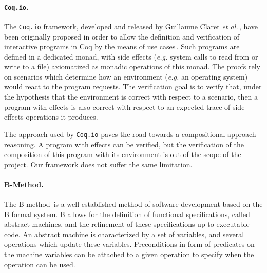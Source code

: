\paragraph{\texttt{Coq.io}.}
%
The \texttt{Coq.io} framework, developed and released by Guillaume Claret
\emph{et al.}\,\cite{claret2015coqiowww}, have been originally proposed in order
to allow the definition and verification of interactive programs in Coq by the
means of use cases\,\cite{claret2015coqio}.
%
Such programs are defined in a dedicated monad, with side effects (\emph{e.g.}
system calls to read from or write to a file) axiomatized as monadic operations
of this monad.
%
The proofs rely on scenarios which determine how an environment (\emph{e.g.} an
operating system) would react to the program requests.
%
The verification goal is to verify that, under the hypothesis that the
environment is correct with respect to a scenario, then a program with effects
is also correct with respect to an expected trace of side effects operations it
produces.

The approach used by \texttt{Coq.io} paves the road towards a compositional
approach reasoning.
%
A program with effects can be verified, but the verification of the composition
of this program with its environment is out of the scope of the project.
%
Our framework does not suffer the same limitation.

\paragraph{B-Method.}
%
The B-method\,\cite{abrial2005b} is a well-established method of software
development based on the B formal system.
%
B allows for the definition of functional specifications, called abstract
machines, and the refinement of these specifications up to executable code.
%
An abstract machine is characterized by a set of variables, and several
operations which update these variables. Preconditions in form of
predicates on the machine variables can be attached to a given operation to
specify when the operation can be used.

